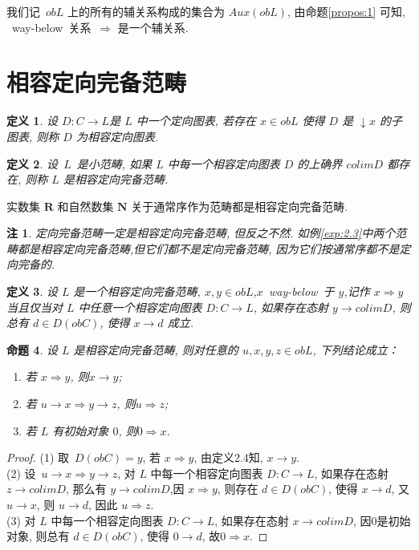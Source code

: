 \documentclass[c5size,a4paper,hyperref,fancyhdr,UTF8,fontset=fandol]{ctexart}
\theoremstyle{nonumberplain}
\newtheorem{proof}{证明}
\newtheorem{notation}{注}
\newtheorem{definition}{定义}[section]
\newtheorem{proposition}[definition]{命题}
\theoremstyle{nonumberplain}
\newtheorem{proof}{证}
\newtheorem{notation}{注}
\begin{document}
我们记~$obL$ 上的所有的辅关系构成的集合为 $Aux(obL)$, 由命题\ref{propos:1} 可知, ~way-below~关系~$\Rightarrow$ 是一个辅关系.


\section{相容定向完备范畴}

\begin{definition}
  设 $D:C\rightarrow L$是 $L$ 中一个定向图表, 若存在 $x\in obL$ 使得 $D$ 是 $\downarrow x$ 的子图表, 则称 $D$ 为相容定向图表.
\end{definition}

\begin{definition}
  设~$L$~是小范畴, 如果 $L$ 中每一个相容定向图表 $D$ 的上确界 $colim D$ 都存在, 则称 $L$ 是相容定向完备范畴.
\end{definition}

\begin{example}\label{exp:2.3}
  实数集 $\mathbf{R}$ 和自然数集 $\mathbf{N}$ 关于通常序作为范畴都是相容定向完备范畴.
\end{example}

\begin{notation}
  定向完备范畴一定是相容定向完备范畴, 但反之不然. 如例\ref{exp:2.3}中两个范畴都是相容定向完备范畴,但它们都不是定向完备范畴, 因为它们按通常序都不是定向完备的.
\end{notation}

\begin{definition}
  设 $L$ 是一个相容定向完备范畴, $x,y\in obL$,$x$~way-below~于 $y$,记作 $x\Rightarrow y$ 当且仅当对 $L$ 中任意一个相容定向图表 $D:C\rightarrow L$, 如果存在态射 $y\rightarrow colim D$, 则总有 $d\in D(obC)$, 使得 $x\rightarrow d$ 成立.
\end{definition}

\begin{proposition}\label{prop:2.5}
  设 $L$ 是相容定向完备范畴, 则对任意的 $u,x,y,z\in obL$, 下列结论成立：
  \begin{enumerate}
    \item 若 $x\Rightarrow y$, 则$x\rightarrow y$;
    \item 若 $u\rightarrow x\Rightarrow y\rightarrow z$, 则$u\Rightarrow z$;
    \item 若 $L$ 有初始对象 $0$, 则$0\Rightarrow x$.
  \end{enumerate}
\end{proposition}

\begin{proof}
  (1) 取~$D(obC)={y}$, 若 $x\Rightarrow y$, 由定义2.4知, $x\rightarrow y$.\\
  \indent (2) 设~$u\rightarrow x\Rightarrow y\rightarrow z$, 对 $L$ 中每一个相容定向图表 $D:C\rightarrow L$, 如果存在态射 $z\rightarrow colim D$, 那么有 $y\rightarrow colimD$,因 $x\Rightarrow y$, 则存在 $d\in D(obC)$, 使得 $x\rightarrow d$, 又 $u\rightarrow x$, 则 $u\rightarrow d$, 因此 $u\Rightarrow z$.\\
  \indent (3) 对 $L$ 中每一个相容定向图表 $D:C\rightarrow L$, 如果存在态射 $x\rightarrow colim D$, 因0是初始对象, 则总有 $d\in D(obC)$, 使得 $0\rightarrow d$, 故$0\Rightarrow x$.
\end{proof}
\end{document}

